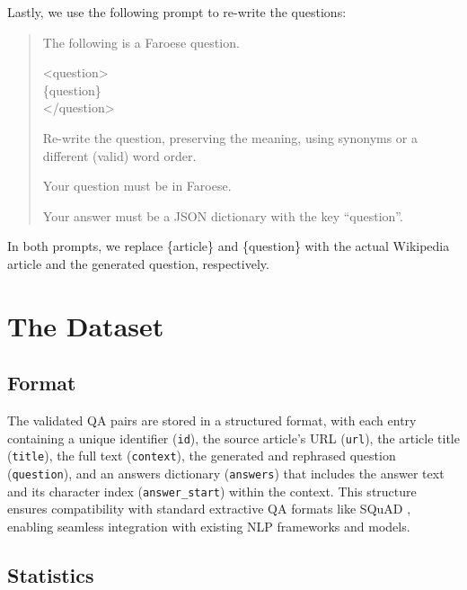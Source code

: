 \documentclass[11pt]{article}
\begin{document}
Lastly, we use the following prompt to re-write the questions:

\begin{quote}
\small
The following is a Faroese question.

<question>\\
\{question\}\\
</question>

Re-write the question, preserving the meaning, using synonyms or a different (valid) word order.

Your question must be in Faroese.

Your answer must be a JSON dictionary with the key ``question''.
\end{quote}

In both prompts, we replace \{article\} and \{question\} with the actual Wikipedia
article and the generated question, respectively.


\section{The Dataset}
\label{sec:thedataset}

\subsection{Format}
\label{subsec:format}

The validated QA pairs are stored in a structured format, with each entry containing a
unique identifier (\texttt{id}), the source article's URL (\texttt{url}), the article
title (\texttt{title}), the full text (\texttt{context}), the generated and rephrased
question (\texttt{question}), and an answers dictionary (\texttt{answers}) that includes
the answer text and its character index (\texttt{answer\_start}) within the context.
This structure ensures compatibility with standard extractive QA formats like SQuAD
\cite{rajpurkar2016squad}, enabling seamless integration with existing NLP frameworks
and models.

\subsection{Statistics}
\label{subsec:statistics}
\end{document}
